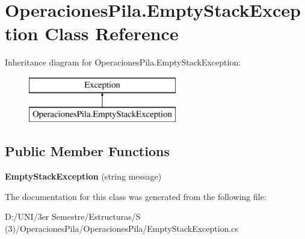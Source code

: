 \hypertarget{class_operaciones_pila_1_1_empty_stack_exception}{}\section{Operaciones\+Pila.\+Empty\+Stack\+Exception Class Reference}
\label{class_operaciones_pila_1_1_empty_stack_exception}
Inheritance diagram for Operaciones\+Pila.\+Empty\+Stack\+Exception\+:\begin{figure}[H]
\begin{center}
\leavevmode
\includegraphics[height=2.000000cm]{class_operaciones_pila_1_1_empty_stack_exception}
\end{center}
\end{figure}
\subsection*{Public Member Functions}
\begin{DoxyCompactItemize}
\item 
\mbox{\label{class_operaciones_pila_1_1_empty_stack_exception_a5336e29287c3a274358967d8ca2c22f9}} 
{\bfseries Empty\+Stack\+Exception} (string message)
\end{DoxyCompactItemize}


The documentation for this class was generated from the following file\+:\begin{DoxyCompactItemize}
\item 
D\+:/\+U\+N\+I/3er Semestre/\+Estructuras/\+S (3)/\+Operaciones\+Pila/\+Operaciones\+Pila/Empty\+Stack\+Exception.\+cs\end{DoxyCompactItemize}
